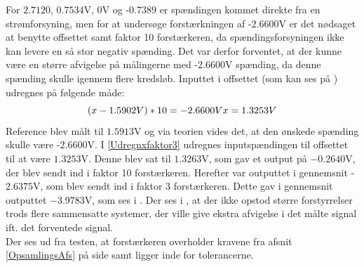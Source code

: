 For $2.7120$, $0.7534$V, $0$V og -$0.7389$ er spændingen kommet direkte fra en strømforsyning, men for at undersøge forstærkningen af -$2.6600$V er det nødsaget at benytte offsettet samt faktor 10 forstærkeren, da spændingsforsyningen ikke kan levere en så stor negativ spænding. Det var derfor forventet, at der kunne være en større afvigelse på målingerne med -$2.6600$V spænding, da denne spænding skulle igennem flere kredsløb. Inputtet i offsettet (som kan ses på ) udregnes på følgende måde:
\begin{equation}\label{Udregnxfaktor3}
( x - 1.5902V ) * 10 = -2.6600V \\
x = 1.3253V
\end{equation}
Reference blev målt til $1.5913$V og via teorien vides det, at den ønskede spænding skulle være -$2.6600$V. I \eqref{Udregnxfaktor3} udregnes inputspændingen til offsettet til at være $1.3253$V. Denne blev sat til $1.3263$V, som gav et output på $-0.2640$V, der blev sendt ind i faktor 10 forstærkeren. Herefter var outputtet i gennemsnit -$2.6375$V, som blev sendt ind i faktor 3 forstærkeren. Dette gav i gennemsnit outputtet $-3.9783$V, som ses i . %
Der ses i , at der ikke opstod større forstyrrelser trods flere sammensatte systemer, der ville give ekstra afvigelse i det målte signal ift. det forventede signal. \\
Der ses ud fra testen, at forstærkeren overholder kravene fra afsnit \ref{OpsamlingsAfs} på side \pageref{OpsamlingsAfs} samt ligger inde for tolerancerne.